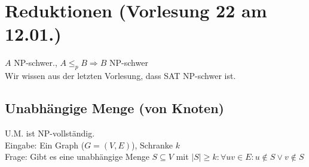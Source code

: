 \section{Reduktionen \tiny (Vorlesung 22 am 12.01.)}
$A$ NP-schwer., $A \leq_p B \Rightarrow B$ NP-schwer\\
Wir wissen aus der letzten Vorlesung, dass SAT NP-schwer ist.
\subsection{Unabhängige Menge (von Knoten)}
U.M. ist NP-vollständig. \\
Eingabe: Ein Graph ($G = (V,E)$), Schranke $k$\\
Frage: Gibt es eine unabhängige Menge $S \subseteq V$ mit $|S| \geq k: \forall uv \in E: u \notin S \lor v \notin S$\\
